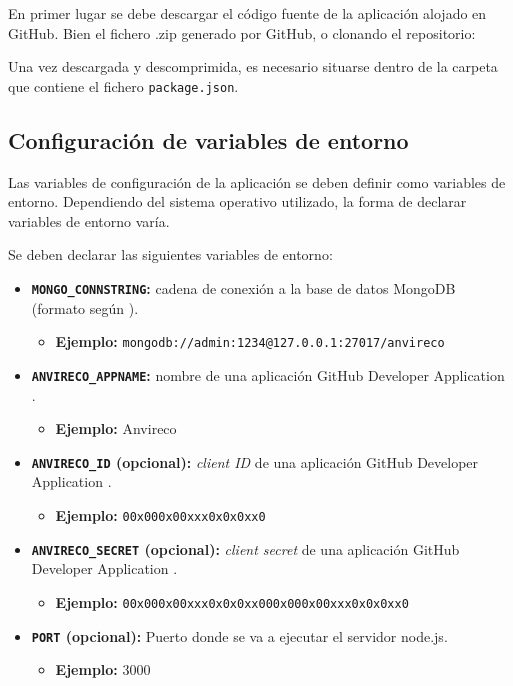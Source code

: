 En primer lugar se debe descargar el código fuente de la aplicación alojado en GitHub. Bien el fichero .zip generado por GitHub, o clonando el repositorio:




Una vez descargada y descomprimida, es necesario situarse dentro de la carpeta que contiene el fichero \texttt{package.json}.

\subsection{Configuración de variables de entorno}

Las variables de configuración de la aplicación se deben definir como variables de entorno. Dependiendo del sistema operativo utilizado, la forma de declarar variables de entorno varía.

Se deben declarar las siguientes variables de entorno:

\begin{itemize}
	\item \textbf{\texttt{MONGO\_CONNSTRING}:} cadena de conexión a la base de datos MongoDB (formato según \cite{connstring}).
	\begin{itemize}
	 	\item \textbf{Ejemplo:} \texttt{mongodb://admin:1234@127.0.0.1:27017/anvireco}
	\end{itemize}
	\item \textbf{\texttt{ANVIRECO\_APPNAME}:} nombre de una aplicación GitHub Developer Application \cite{devapp}.
	\begin{itemize}
	 	\item \textbf{Ejemplo:} Anvireco
	\end{itemize}
	\item \textbf{\texttt{ANVIRECO\_ID} (opcional):} \textit{client ID} de una aplicación GitHub Developer Application \cite{devapp}.
	\begin{itemize}
	 	\item \textbf{Ejemplo:} \texttt{00x000x00xxx0x0x0xx0}
	\end{itemize}
	\item \textbf{\texttt{ANVIRECO\_SECRET} (opcional):} \textit{client secret} de una aplicación GitHub Developer Application \cite{devapp}.
	\begin{itemize}
	 	\item \textbf{Ejemplo:} \texttt{00x000x00xxx0x0x0xx000x000x00xxx0x0x0xx0}
	\end{itemize}
	\item \textbf{\texttt{PORT} (opcional):} Puerto donde se va a ejecutar el servidor node.js.
	\begin{itemize}
	 	\item \textbf{Ejemplo:} 3000
	\end{itemize}
\end{itemize}

